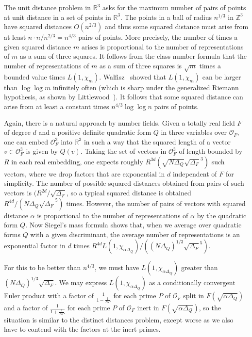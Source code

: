 \documentclass[11pt,reqno]{amsart}
\numberwithin{equation}{section}
\theoremstyle{definition}
\theoremstyle{remark}
\begin{document}
The unit distance problem in $\mathbb R^3$ asks for the maximum number of pairs of points at unit distance in a set of points in $\mathbb R^3$. The points in a ball of radius $n^{1/3}$ in $\mathbb Z^{3}$ have squared distances $O(n^{2/3})$ and thus some squared distance must arise from at least $n \cdot n/ n^{2/3} =n^{4/3}$ pairs of points. More precisely, the number of times a given squared distance $m$ arises is proportional to the number of representations of $m$ as a sum of three squares. It follows from the class number formula that the number of representations of $m$ as a sum of three squares is $\sqrt{m}$ times a bounded value times $L(1, \chi_m)$. Walfisz~\cite{walfisz1942class} showed that $L(1,\chi_m)$ can be larger than $\log \log m$ infinitely often (which is sharp under the generalized Riemann hypothesis, as shown by Littlewood~\cite{Littlewood1928}). It follows that some squared distance can arise from at least a constant times $n^{4/3} \log \log n$ pairs of points.

Again, there is a natural approach by number fields. Given a totally real field $F$ of degree $d$ and a positive definite quadratic form $Q$ in three variables over $\mathcal O_F$, one can embed $\mathcal O_F^3$ into $\mathbb R^3$ in such a way that the squared length of a vector $v\in \mathcal O_F^3$ is given by $Q(v)$. Taking the set of vectors in $\mathcal O_F^3$ of length bounded by $R$ in each real embedding, one expects roughly $R^{3d}( \sqrt{N\Delta_Q} \sqrt{\Delta_F}^3)$ such vectors, where we drop factors that are exponential in $d$ independent of $F$ for simplicity. The number of possible squared distances obtained from pairs of such vectors is  $(R^{2d}/ \sqrt{\Delta_F}$, so a typical squared distance is obtained $ R^{4d} / ( N \Delta_Q \sqrt{\Delta_F}^5)$ times. However, the number of pairs of vectors with squared distance $\alpha$ is proportional to the number of representations of $\alpha$ by the quadratic form $Q$. Now Siegel's mass formula shows that, when we average over quadratic forms $Q$ with a given discriminant, the average number of representations is an exponential factor in $d$ times $ R^{4d} L(1, \chi_{\alpha \Delta_Q}) / ( (N \Delta_Q)^{1/3} \sqrt{\Delta_F}^5)$.

For this to be better than $n^{4/3}$, we must have $L(1,\chi_{\alpha \Delta_Q})$ greater than $(N \Delta_Q )^{1/3} \sqrt{\Delta_F}$. We may express $L(1,\chi_{\alpha \Delta_Q})$ as a conditionally convergent Euler product with a factor of $\frac{1}{1- \frac{1}{NP}}$ for each prime $P$ of $\mathcal O_F$ split in $F(\sqrt{\alpha \Delta_Q})$ and a factor of $\frac{1}{1+\frac{1}{NP}}$ for each prime $P$ of $\mathcal O_F$ inert in $F(\sqrt{\alpha \Delta_Q})$, so the situation is similar to the distinct distances problem, except worse as we also have to contend with the factors at the inert primes. 
\end{document}
